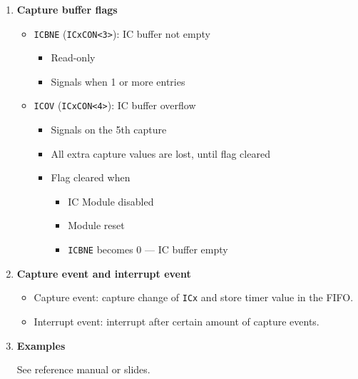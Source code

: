 \documentclass[a4paper]{article}
\begin{document}
\begin{enumerate}[label = \arabic*.]
    \item \textbf{Capture buffer flags}
      \begin{itemize}[leftmargin = 1cm]
        \item \verb|ICBNE| (\verb|ICxCON<3>|): IC buffer not empty
          \begin{itemize}[leftmargin = 1cm]
            \item Read-only
            \item Signals when 1 or more entries
          \end{itemize}
        \item \verb|ICOV| (\verb|ICxCON<4>|): IC buffer overflow
          \begin{itemize}[leftmargin = 1cm]
            \item Signals on the 5th capture
            \item All extra capture values are lost, until flag cleared
            \item Flag cleared when
              \begin{itemize}[leftmargin = 1cm]
                \item IC Module disabled
                \item Module reset
                \item \verb|ICBNE| becomes 0 --- IC buffer empty
              \end{itemize}
          \end{itemize}
      \end{itemize}


    \item \textbf{Capture event and interrupt event}
      \begin{itemize}[leftmargin = 1cm]
        \item Capture event: capture change of \verb|ICx| and store timer value in the FIFO\@.
        \item Interrupt event: interrupt after certain amount of capture events.
      \end{itemize}

    \item \textbf{Examples}
      \par See reference manual or slides.
  \end{enumerate}
\end{document}
